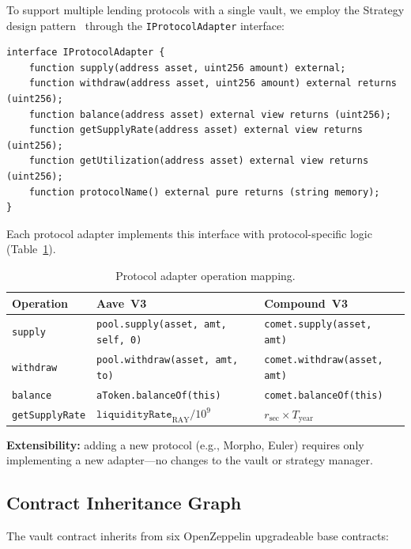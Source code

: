 \documentclass[12pt]{article}
\begin{document}
To support multiple lending protocols with a single vault, we employ the Strategy design pattern~\cite{gof} through the \texttt{IProtocolAdapter} interface:

\begin{lstlisting}[language=Solidity]
interface IProtocolAdapter {
    function supply(address asset, uint256 amount) external;
    function withdraw(address asset, uint256 amount) external returns (uint256);
    function balance(address asset) external view returns (uint256);
    function getSupplyRate(address asset) external view returns (uint256);
    function getUtilization(address asset) external view returns (uint256);
    function protocolName() external pure returns (string memory);
}
\end{lstlisting}

Each protocol adapter implements this interface with protocol-specific logic (Table~\ref{tab:adapter-ops}).

\begin{table}[H]
\centering
\caption{Protocol adapter operation mapping.}
\label{tab:adapter-ops}
\small
\begin{tabular}{@{}lll@{}}
\toprule
\textbf{Operation} & \textbf{Aave~V3} & \textbf{Compound~V3} \\
\midrule
\texttt{supply}       & \texttt{pool.supply(asset, amt, self, 0)} & \texttt{comet.supply(asset, amt)} \\
\texttt{withdraw}     & \texttt{pool.withdraw(asset, amt, to)}    & \texttt{comet.withdraw(asset, amt)} \\
\texttt{balance}      & \texttt{aToken.balanceOf(this)}           & \texttt{comet.balanceOf(this)} \\
\texttt{getSupplyRate}& $\texttt{liquidityRate}_{\text{RAY}}/10^9$& $r_{\text{sec}} \times T_{\text{year}}$ \\
\bottomrule
\end{tabular}
\end{table}

\textbf{Extensibility:} adding a new protocol (e.g., Morpho, Euler) requires only implementing a new adapter---no changes to the vault or strategy manager.

\subsection{Contract Inheritance Graph}

The vault contract inherits from six OpenZeppelin upgradeable base contracts:
\end{document}

